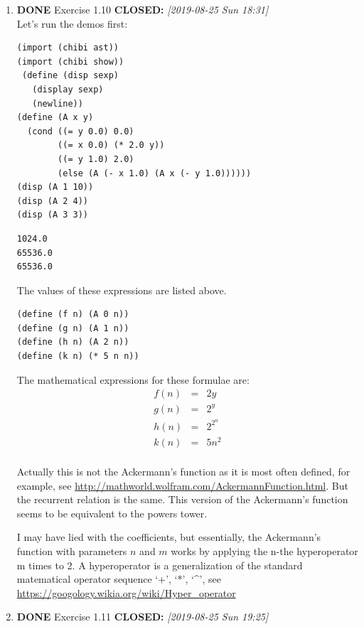 \documentclass[11pt]{article}
\begin{document}
\begin{enumerate}
\begin{enumerate}
\item {\bfseries\sffamily DONE} Exercise 1.10
\label{sec:org8003665}
\noindent\textbf{CLOSED:} \textit{[2019-08-25 Sun 18:31]}\\
Let's run the demos first:
\lstset{language=Lisp,label=orgbe345e1,caption= ,captionpos=b,numbers=none}
\begin{lstlisting}
(import (chibi ast))
(import (chibi show))
 (define (disp sexp)
   (display sexp)
   (newline))
(define (A x y)
  (cond ((= y 0.0) 0.0)
        ((= x 0.0) (* 2.0 y))
        ((= y 1.0) 2.0)
        (else (A (- x 1.0) (A x (- y 1.0))))))
(disp (A 1 10))
(disp (A 2 4))
(disp (A 3 3))
\end{lstlisting}

\begin{verbatim}
1024.0
65536.0
65536.0
\end{verbatim}

The values of these expressions are listed above.

\lstset{language=Lisp,label= ,caption= ,captionpos=b,numbers=none}
\begin{lstlisting}
(define (f n) (A 0 n))
(define (g n) (A 1 n))
(define (h n) (A 2 n))
(define (k n) (* 5 n n))
\end{lstlisting}

The mathematical expressions for these formulae are:
\begin{eqnarray}
\label{eq:3}
f(n) & = & 2y\\
g(n) & = & 2^y \\
h(n) & = & 2^{2^n}\\
k(n) & = & 5n^2\\
\end{eqnarray}

Actually this is not the Ackermann's function as it is most often
defined, for example, see
\url{http://mathworld.wolfram.com/AckermannFunction.html}. But the
recurrent relation is the same. This version of the Ackermann's
function seems to be equivalent to the powers tower.

I may have lied with the coefficients, but essentially, the
Ackermann's function with parameters \(n\) and \(m\) works by applying the
n-the hyperoperator m times to 2. A hyperoperator is a generalization
of the standard matematical operator sequence `+', `*', `\^{}', see
\url{https://googology.wikia.org/wiki/Hyper\_operator}


\item {\bfseries\sffamily DONE} Exercise 1.11
\label{sec:org8f2ddae}
\noindent\textbf{CLOSED:} \textit{[2019-08-25 Sun 19:25]}\\


\end{enumerate}
\end{enumerate}
\end{document}
